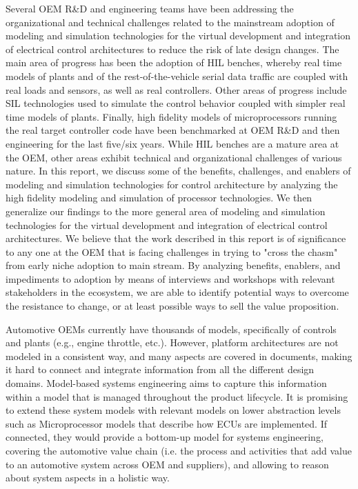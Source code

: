 Several OEM R&D and engineering teams have been addressing the organizational and technical challenges related to the mainstream adoption of modeling and simulation technologies for the virtual development and integration of electrical control architectures to reduce the risk of late design changes. The main area of progress has been the adoption of HIL benches, whereby real time models of plants and of the rest-of-the-vehicle serial data traffic are coupled with real loads and sensors, as well as real controllers. Other areas of progress include SIL technologies used to simulate the control behavior coupled with simpler real time models of plants. Finally, high fidelity models of microprocessors running the real target controller code have been benchmarked at OEM R&D and then engineering for the last five/six years. While HIL benches are a mature area at the OEM, other areas exhibit technical and organizational challenges of various nature. In this report, we discuss some of the benefits, challenges, and enablers of modeling and simulation technologies for control architecture by analyzing the high fidelity modeling and simulation of processor technologies. We then generalize our findings to the more general area of modeling and simulation technologies for the virtual development and integration of electrical control architectures. We believe that the work described in this report is of significance to any one at the OEM that is facing challenges in trying to "cross the chasm" from early niche adoption to main stream. By analyzing benefits, enablers, and impediments to adoption by means of interviews and workshops with relevant stakeholders in the ecosystem, we are able to identify potential ways to overcome the resistance to change, or at least possible ways to sell the value proposition.

Automotive OEMs currently have thousands of models, specifically of controls and plants (e.g., engine throttle, etc.). However, platform architectures are not modeled in a consistent way, and many aspects are covered in documents, making it hard to connect and integrate information from all the different design domains. Model-based systems engineering aims to capture this information within a model that is managed throughout the product lifecycle. It is promising to extend these system models with relevant models on lower abstraction levels such as Microprocessor models that describe how ECUs are implemented. If connected, they would provide a bottom-up model for systems engineering, covering the automotive value chain (i.e. the process and activities that add value to an automotive system across OEM and suppliers), and allowing to reason about system aspects in a holistic way.


